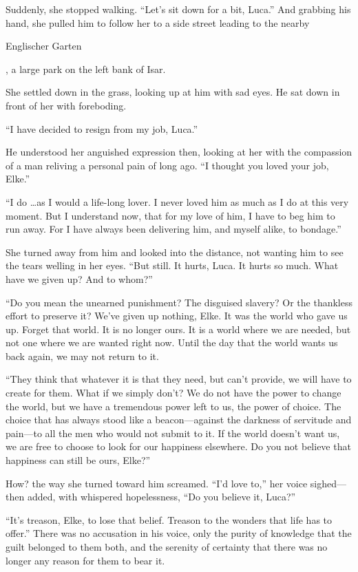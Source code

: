 Suddenly, she stopped walking. ``Let's sit down for a bit, Luca.'' And grabbing his hand, she pulled him to follow her to a side street leading to the nearby \begin{otherlanguage}{ngerman}Englischer Garten\end{otherlanguage}, a large park on the left bank of Isar.

She settled down in the grass, looking up at him with sad eyes. He sat down in front of her with foreboding.

``I have decided to resign from my job, Luca.''

He understood her anguished expression then, looking at her with the compassion of a man reliving a personal pain of long ago. ``I thought you loved your job, Elke.''

``I do \ldots as I would a life-long lover. I never loved him as much as I do at this very moment. But I understand now, that for my love of him, I have to beg him to run away. For I have always been delivering him, and myself alike, to bondage.''

She turned away from him and looked into the distance, not wanting him to see the tears welling in her eyes. ``But still. It hurts, Luca. It hurts so much. What have we given up? And to whom?''

``Do you mean the unearned punishment? The disguised slavery? Or the thankless effort to preserve it? We've given up nothing, Elke. It was the world who gave us up. Forget that world. It is no longer ours. It is a world where we are needed, but not one where we are wanted right now. Until the day that the world wants us back again, we may not return to it.

``They think that whatever it is that they need, but can't provide, we will have to create for them. What if we simply don't? We do not have the power to change the world, but we have a tremendous power left to us, the power of choice. The choice that has always stood like a beacon---against the darkness of servitude and pain---to all the men who would not submit to it. If the world doesn't want us, we are free to choose to look for our happiness elsewhere. Do you not believe that happiness can still be ours, Elke?''

How? the way she turned toward him screamed. ``I'd love to,'' her voice sighed---then added, with whispered hopelessness, ``Do you believe it, Luca?''

``It's treason, Elke, to lose that belief. Treason to the wonders that life has to offer.'' There was no accusation in his voice, only the purity of knowledge that the guilt belonged to them both, and the serenity of certainty that there was no longer any reason for them to bear it.

